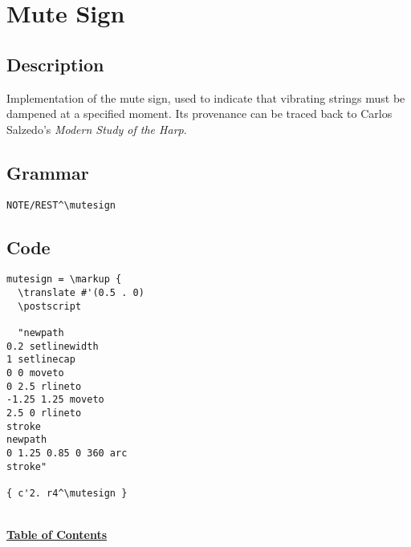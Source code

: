 \vfill \break







\section {Mute Sign}
\hfill

\subsection{Description}
Implementation of the mute sign, used to indicate that vibrating strings must be dampened at a specified moment. Its provenance can be traced back to Carlos Salzedo's \textit{Modern Study of the Harp}.\autocite[19]{RN4} 

\subsection{Grammar}
\begin{verbatim}
NOTE/REST^\mutesign
\end{verbatim}
\subsection{Code}
\begin{verbatim}
mutesign = \markup {
  \translate #'(0.5 . 0)
  \postscript

  "newpath
0.2 setlinewidth
1 setlinecap
0 0 moveto
0 2.5 rlineto
-1.25 1.25 moveto
2.5 0 rlineto
stroke
newpath
0 1.25 0.85 0 360 arc
stroke"

{ c'2. r4^\mutesign }

\end{verbatim}
\hyperref[sec:toc]{\\ \textbf{Table of Contents}}

\vfill \break


